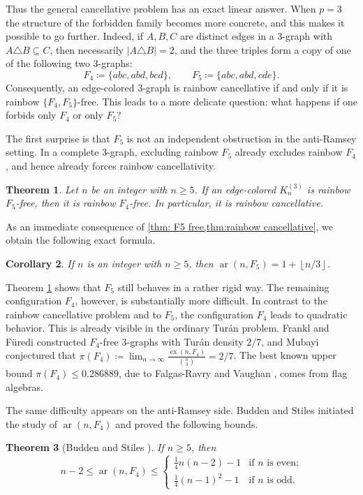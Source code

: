 \documentclass[10pt,a4paper]{article}
\newtheorem{theorem}{Theorem}[section]
\newtheorem{corollary}[theorem]{Corollary}
\theoremstyle{definition}
\newcommand{\floor}[1]{\left\lfloor #1 \right\rfloor}
\DeclareMathOperator{\ex}{ex}
\DeclareMathOperator{\ar}{ar}
\begin{document}
Thus the general cancellative problem has an exact linear answer.
When $p=3$ the structure of the forbidden family becomes more concrete, and this makes it possible to go further.
Indeed, if $A,B,C$ are distinct edges in a $3$-graph with $A\triangle B\subseteq C$, then necessarily $|A\triangle B|=2$, and the three triples form a copy of one of the following two $3$-graphs:
\[
    F_4\coloneqq\{abc,abd,bcd\},
    \qquad
    F_5\coloneqq\{abc,abd,cde\}.
\]
Consequently, an edge-colored $3$-graph is rainbow cancellative if and only if it is rainbow $\{F_4,F_5\}$-free.
This leads to a more delicate question: what happens if one forbids only \(F_4\) or only \(F_5\)?

The first surprise is that \(F_5\) is not an independent obstruction in the anti-Ramsey setting.
In a complete \(3\)-graph, excluding rainbow \(F_5\) already excludes rainbow \(F_4\), and hence already forces rainbow cancellativity.

\begin{theorem}\label{thm: F5 free}
    Let $n$ be an integer with $n\ge5$.
    If an edge-colored $K_n^{(3)}$ is rainbow $F_5$-free, then it is rainbow $F_4$-free.
    In particular, it is rainbow cancellative.
\end{theorem}
As an immediate consequence of \cref{thm: F5 free,thm:rainbow cancellative}, we obtain the following exact formula.
\begin{corollary}\label{coro:maximum color}
    If $n$ is an integer with $n\ge5$, then $\ar(n,F_5)=1+\floor{n/3}$.
\end{corollary}

Theorem \ref{thm: F5 free} shows that $F_5$ still behaves in a rather rigid way.
The remaining configuration $F_4$, however, is substantially more difficult.
In contrast to the rainbow cancellative problem and to \(F_5\), the configuration \(F_4\) leads to quadratic behavior.
This is already visible in the ordinary Tur\'an problem.
Frankl and F\"uredi \cite{frankl} constructed $F_4$-free $3$-graphs with Tur\'an density $2/7$, and Mubayi \cite{mubayi} conjectured that $\pi(F_4)\coloneqq \lim_{n\to\infty}\frac{\ex(n,F_4)}{\binom{n}{3}}=2/7$.
The best known upper bound $\pi(F_4)\le 0.286889$, due to Falgas-Ravry and Vaughan \cite{falgasravry}, comes from flag algebras.



The same difficulty appears on the anti-Ramsey side.
Budden and Stiles \cite{budden} initiated the study of $\ar(n,F_4)$ and proved the following bounds.
\begin{theorem}[Budden and Stiles \cite{budden}]\label{thm F4-1}
    If $n\ge5$, then
    \begin{equation*}
        n-2\le \ar(n,F_4)\le
        \begin{cases}
            \frac{1}{4}n(n-2)-1  & \text{if $n$ is even;} \\
            \frac{1}{4}(n-1)^2-1 & \text{if $n$ is odd.}
        \end{cases}
    \end{equation*}
\end{theorem}
\end{document}
